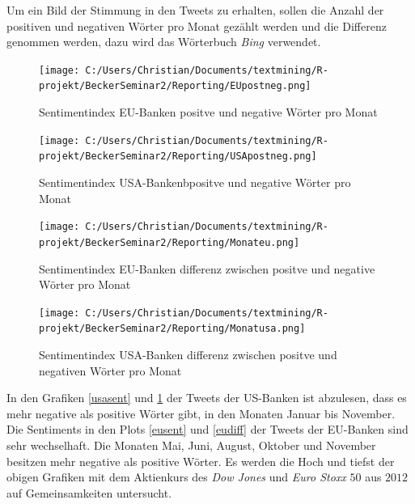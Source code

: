 Um ein Bild der Stimmung in den Tweets zu erhalten, sollen die Anzahl der positiven und negativen Wörter pro Monat gezählt werden und die Differenz genommen werden, dazu wird das Wörterbuch \textit{Bing} verwendet.
\begin{figure}[H]
	\begin{minipage}[b]{.4\linewidth} %
		\texttt{[image: C:/Users/Christian/Documents/textmining/R-projekt/BeckerSeminar2/Reporting/EUpostneg.png]}
		\caption{Sentimentindex EU-Banken positve und negative Wörter pro Monat} \label{eusent}
	\end{minipage}
	\hspace{.1\linewidth}%
	\begin{minipage}[b]{.4\linewidth} %
		\texttt{[image: C:/Users/Christian/Documents/textmining/R-projekt/BeckerSeminar2/Reporting/USApostneg.png]}
		\caption{Sentimentindex USA-Bankenbpositve und negative Wörter pro Monat}\label{usasent}
	\end{minipage}

	\begin{minipage}[b]{.4\linewidth} %
	\texttt{[image: C:/Users/Christian/Documents/textmining/R-projekt/BeckerSeminar2/Reporting/Monateu.png]}
	\caption{Sentimentindex EU-Banken differenz  zwischen positve und negative Wörter pro Monat}\label{eudiff}
\end{minipage}
	\hspace{.2\linewidth}
\begin{minipage}[b]{.4\linewidth} %
	\texttt{[image: C:/Users/Christian/Documents/textmining/R-projekt/BeckerSeminar2/Reporting/Monatusa.png]}
	\caption{Sentimentindex USA-Banken differenz  zwischen positve und negativen Wörter pro Monat}\label{usadiff}
\end{minipage}
\end{figure}
In den Grafiken \ref{usasent} und \ref{usadiff} der Tweets der US-Banken  ist abzulesen, dass es mehr negative als positive Wörter gibt, in den Monaten Januar bis November. Die Sentiments in den Plots \ref{eusent} und \ref{eudiff} der Tweets der EU-Banken sind sehr wechselhaft. Die Monaten Mai, Juni, August, Oktober und November besitzen mehr negative als positive Wörter. Es werden die Hoch und tiefst der obigen Grafiken mit dem Aktienkurs des \textit{Dow Jones} und \textit{Euro Stoxx} $50$ aus $2012$ auf Gemeinsamkeiten untersucht. 

